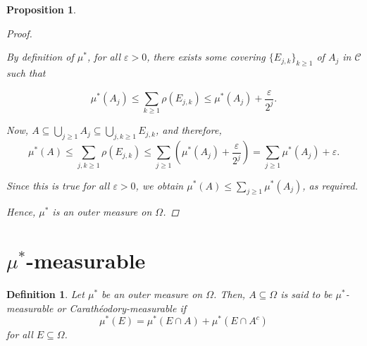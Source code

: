 \documentclass{article}
\newcommand{\C}{\mathscr{C}}
\theoremstyle{spaced}
\newtheorem{definition}[theorem]{Definition}
\newtheorem{proposition}[theorem]{Proposition}
\begin{document}
\begin{proposition}
\begin{proof}
\begin{enumerate}
        By definition of $\mu^*$, for all $\varepsilon > 0 $, there exists some covering $\{E_{j, k}\}_{k \geq 1}$ of $A_j$ in $\C$ such that
        
        \[ \mu^*(A_j) \leq \sum_{k \geq 1} \rho(E_{j, k}) \leq \mu^*(A_j) + \frac{\varepsilon}{2^j}. \]

        Now, $A \subseteq \bigcup_{j \geq 1} A_j \subseteq \bigcup_{j, k \geq 1} E_{j, k}$, and therefore,
        \[ \mu^*(A) \leq \sum_{j, k \geq 1} \rho(E_{j, k}) \leq \sum_{j \geq 1} \left( \mu^*(A_j) + \frac{\varepsilon}{2^j} \right) = \sum_{j \geq 1} \mu^*(A_j) + \varepsilon .\]

        Since this is true for all $\varepsilon > 0$, we obtain $\mu^*(A) \leq \sum_{j \geq 1} \mu^*(A_j)$, as required. 
    \end{enumerate}
    Hence, $\mu^*$ is an outer measure on $\Omega$. 
\end{proof}
\end{proposition}

\section{$\mu^*$-measurable}

\begin{definition}
        Let $\mu^*$ be an outer measure on $\Omega$. Then, $A \subseteq \Omega$ is said to be \textit{$\mu^*$-measurable} or \textit{Carathéodory-measurable} if
        \[ \mu^*(E) = \mu^*(E \cap A) + \mu^*(E \cap A^c) \]
        for all $E \subseteq \Omega$.    
\end{definition}
\end{document}
